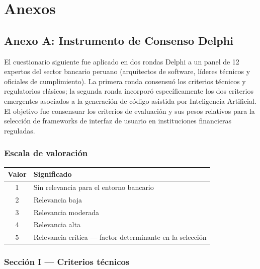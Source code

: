 \chapter*{Anexos}

\section*{Anexo A: Instrumento de Consenso Delphi}

El cuestionario siguiente fue aplicado en dos rondas Delphi a un panel de 12
expertos del sector bancario peruano (arquitectos de software, líderes
técnicos y oficiales de cumplimiento). La primera ronda consensuó los
criterios técnicos y regulatorios clásicos; la segunda ronda incorporó
específicamente los dos criterios emergentes asociados a la generación de
código asistida por Inteligencia Artificial. El objetivo fue consensuar los
criterios de evaluación y sus pesos relativos para la selección de
frameworks de interfaz de usuario en instituciones financieras reguladas.

\subsection*{Escala de valoración}

\begin{center}
\begin{tabular}{@{}cp{10cm}@{}}
\toprule
Valor & Significado \\
\midrule
1 & Sin relevancia para el entorno bancario \\
2 & Relevancia baja \\
3 & Relevancia moderada \\
4 & Relevancia alta \\
5 & Relevancia crítica --- factor determinante en la selección \\
\bottomrule
\end{tabular}
\end{center}

\subsection*{Sección I --- Criterios técnicos}


